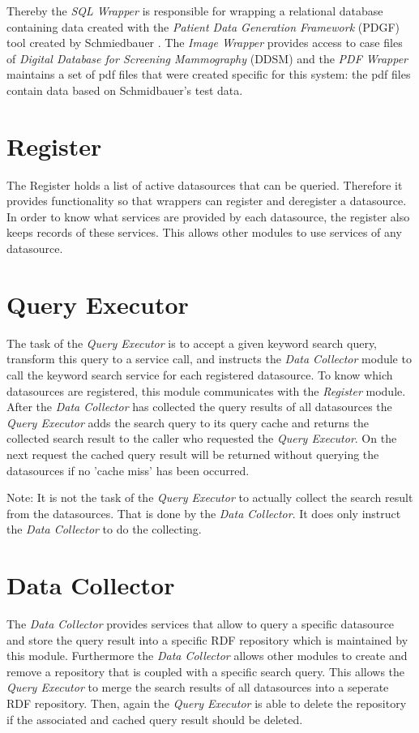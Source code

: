 Thereby the \emph{SQL Wrapper} is responsible for wrapping a relational database containing data created with the \emph{Patient Data Generation Framework} (PDGF) tool created by Schmiedbauer \cite{SchmidbauerBachelorThesis}. The \emph{Image Wrapper} provides access to case files of \emph{Digital Database for Screening Mammography} (DDSM)\cite{DDSM} and the \emph{PDF Wrapper} maintains a set of pdf files that were created specific for this system: the pdf files contain data based on Schmidbauer's test data.

\section{Register}
The Register holds a list of active datasources that can be queried. Therefore it provides functionality so that wrappers can register and deregister a datasource. In order to know what services are provided by each datasource, the register also keeps records of these services. This allows other modules to use services of any datasource.
\section{Query Executor}
The task of the \emph{Query Executor} is to accept a given keyword search query, transform this query to a service call, and instructs the \emph{Data Collector} module to call the keyword search service for each registered datasource. To know which datasources are registered, this module communicates with the \emph{Register} module. After the \emph{Data Collector} has collected the query results of all datasources the \emph{Query Executor} adds the search query to its query cache and returns the collected search result to the caller who requested the \emph{Query Executor}. On the next request the cached query result will be returned without querying the datasources if no 'cache miss' has been occurred.

Note: It is not the task of the \emph{Query Executor} to actually collect the search result from the datasources. That is done by the \emph{Data Collector}. It does only instruct the \emph{Data Collector} to do the collecting.

\section{Data Collector}
The \emph{Data Collector} provides services that allow to query a specific  datasource and store the query result into a specific RDF repository which is maintained by this module. Furthermore the \emph{Data Collector} allows other modules to create and remove a repository that is coupled with a specific search query. This allows the \emph{Query Executor} to merge the search results of all datasources into a seperate RDF repository. Then, again the \emph{Query Executor} is able to delete the repository if the associated and cached query result should be deleted. 

